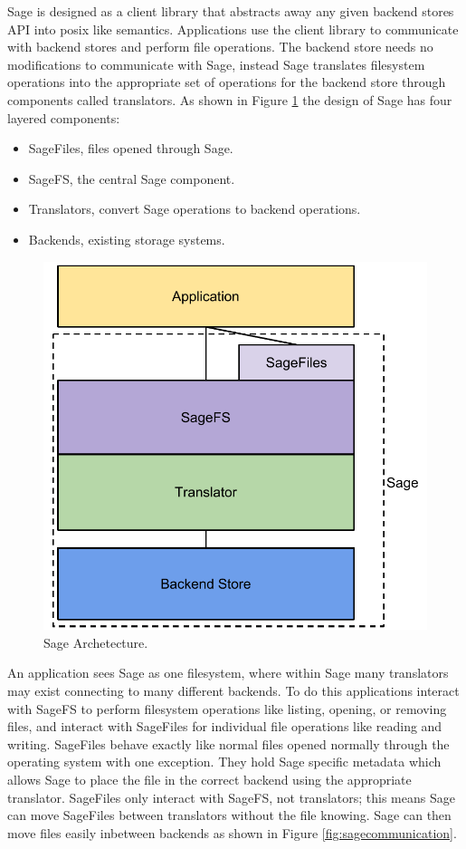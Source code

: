 Sage is designed as a client library that abstracts away any given backend stores API into posix like semantics. Applications use the client library to communicate with backend stores and perform file operations. The backend store needs no modifications to communicate with Sage, instead Sage translates filesystem operations into the appropriate set of operations for the backend store through components called translators. As shown in Figure \ref{fig:archetecture} the design of Sage has four layered components:
\begin{itemize}
\item SageFiles, files opened through Sage.
\item SageFS, the central Sage component.
\item Translators, convert Sage operations to backend operations.
\item Backends, existing storage systems.
\end{itemize}

\begin{figure}[h!]
\centering
\includegraphics[scale=0.7]{figures/archetecture}
\caption[Sage Archetecture]{Sage Archetecture.}
\label{fig:archetecture}
\end{figure}

An application sees Sage as one filesystem, where within Sage many translators may exist connecting to many different backends. To do this applications interact with SageFS to perform filesystem operations like listing, opening, or removing files, and interact with SageFiles for individual file operations like reading and writing. SageFiles behave exactly like normal files opened normally through the operating system with one exception. They hold Sage specific metadata which allows Sage to place the file in the correct backend using the appropriate translator. SageFiles only interact with SageFS, not translators; this means Sage can move SageFiles between translators without the file knowing. Sage can then move files easily inbetween backends as shown in Figure \ref{fig:sagecommunication}.

